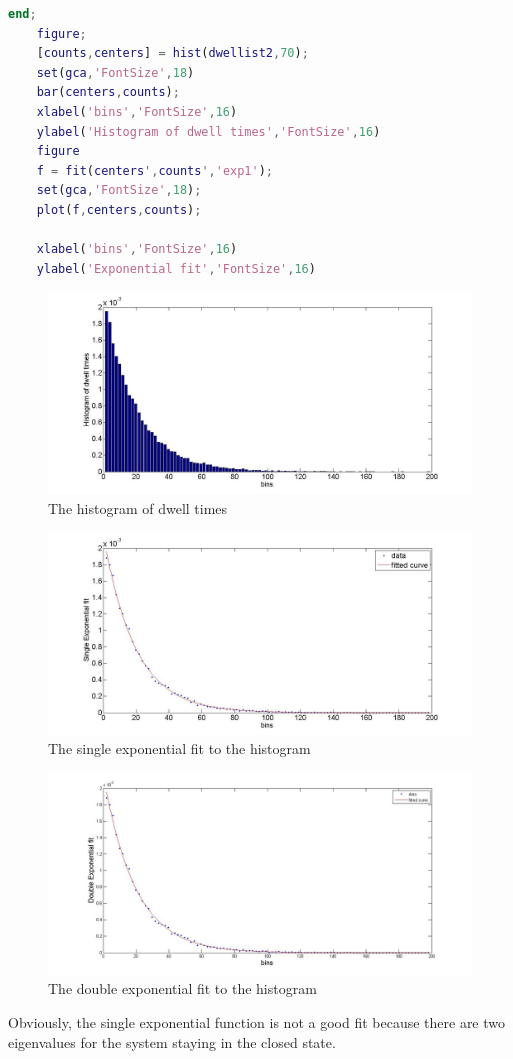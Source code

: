 \documentclass[a4paper]{article}
\begin{document}
\begin{itemize}
\begin{lstlisting}[language=Matlab,frame=single]
 	end;
 	figure;
 	[counts,centers] = hist(dwellist2,70);
 	set(gca,'FontSize',18)
 	bar(centers,counts);
 	xlabel('bins','FontSize',16)
 	ylabel('Histogram of dwell times','FontSize',16)
 	figure
 	f = fit(centers',counts','exp1');
 	set(gca,'FontSize',18);
 	plot(f,centers,counts);
 	
 	xlabel('bins','FontSize',16)
 	ylabel('Exponential fit','FontSize',16)

 	\end{lstlisting}
 	
 	
 	 \begin{figure}[h]
 	 	\centering
 	 	\includegraphics[width=12cm]{hist}
 	 	\caption{The histogram of dwell times}
 	 \end{figure}
 	 
   \begin{figure}[H]
   	\centering
   	\includegraphics[width=12cm]{expfit}
   	\caption{The single exponential fit to the histogram}
   \end{figure}
   
   \begin{figure}[H]
   	\centering
   	\includegraphics[width=12cm]{expfit2}
   	\caption{The double exponential fit to the histogram}
   \end{figure}   
   Obviously, the single exponential function is not a good fit because there are two eigenvalues for the system staying in the closed state.
 	  	 
 \end{itemize}
\end{document}
